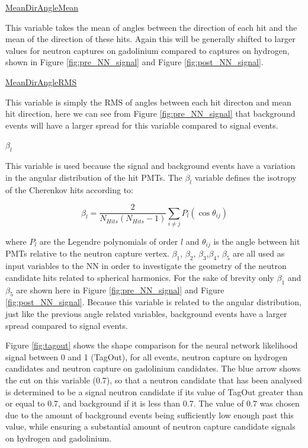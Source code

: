 \underline{MeanDirAngleMean}

This variable takes the mean of angles between the direction of each hit and the mean of the direction of these hits. Again this will be generally shifted to larger values for neutron captures on gadolinium compared to captures on hydrogen, shown in Figure \ref{fig:pre_NN_signal} and Figure \ref{fig:post_NN_signal}. 

\underline{MeanDirAngleRMS}

This variable is simply the RMS of angles between each hit directon and mean hit direction, here we can see from Figure \ref{fig:pre_NN_signal} that background events will have a larger spread for this variable compared to signal events. 



\underline{$\beta_{l}$}

This variable is used because the signal and background events have a variation in the angular distribution of the hit PMTs. 
The $\beta_{l}$ variable defines the isotropy of the Cherenkov hits according to:

\begin{equation}
    \beta_{l}=\frac{2}{N_{H i t s}\left(N_{H i t s}-1\right)} \sum_{i \neq j} P_l\left(\cos \theta_{i j}\right)
\end{equation}

where $P_{l}$ are the Legendre polynomials of order $l$ and $\theta_{ij}$ is the angle between hit PMTs relative to the neutron capture vertex. $\beta_{1}$, $\beta_{2}$, $\beta_{3}$,$\beta_{4}$, $\beta_{5}$ are all used as input variables to the NN in order to investigate the geometry of the neutron candidate hits related to spherical harmonics. For the sake of brevity only $\beta_{1}$ and $\beta_{5}$ are shown here in Figure \ref{fig:pre_NN_signal} and Figure \ref{fig:post_NN_signal}. Because this variable is related to the angular distribution, just like the previous angle related variables, background events have a larger spread compared to signal events.




Figure \ref{fig:tagout} shows the shape comparison for the neural network likelihood signal between 0 and 1 (TagOut), for all events, neutron capture on hydrogen candidates and neutron capture on gadolinium candidates. The blue arrow shows the cut on this variable (0.7), so that a neutron candidate that has been analysed is determined to be a signal neutron candidate if its value of TagOut greater than or equal to 0.7, and background if it is less than 0.7. The value of 0.7 was chosen due to the amount of background events being sufficiently low enough past this value, while ensuring a substantial amount of neutron capture candidate signals on hydrogen and gadolinium.

